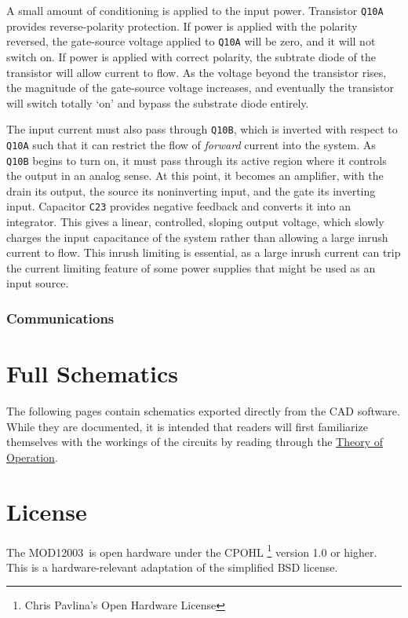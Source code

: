 \documentclass[letterpaper,twocolumn,10pt,openany,oneside,final,fleqn]{memoir}
\newcommand{\Model}{MOD12003\ }
\newcommand{\rd}[1]{\texttt{#1}}
\begin{document}
A small amount of conditioning is applied to the input power. Transistor \rd{Q10A}
provides reverse-polarity protection. If power is applied with the polarity reversed,
the gate-source voltage applied to \rd{Q10A} will be zero, and it will not switch
on. If power is applied with correct polarity, the subtrate diode of the transistor
will allow current to flow. As the voltage beyond the transistor rises, the magnitude
of the gate-source voltage increases, and eventually the transistor will switch totally
`on' and bypass the substrate diode entirely.

The input current must also pass through \rd{Q10B}, which is inverted with respect
to \rd{Q10A} such that it can restrict the flow of \emph{forward} current into the
system. As \rd{Q10B} begins to turn on, it must pass through its active region where
it controls the output in an analog sense. At this point, it becomes an amplifier,
with the drain its output, the source its noninverting input, and the gate its
inverting input. Capacitor \rd{C23} provides negative feedback and converts it into
an integrator. This gives a linear, controlled, sloping output voltage, which
slowly charges the input capacitance of the system rather than allowing a large
inrush current to flow. This inrush limiting is essential, as a large inrush current
can trip the current limiting feature of some power supplies that might be used
as an input source.

\subsection{Communications}


\newpage
\chapter{Full Schematics}
The following pages contain schematics exported directly from the CAD software.
While they are documented, it is intended that readers will first familiarize
themselves with the workings of the circuits by reading through the
\hyperref[chap:too]{Theory of Operation}.



\newpage
\chapter{License}

The \Model is open hardware under the CPOHL
\footnote{Chris Pavlina's Open Hardware License} version 1.0 or higher.
This is a hardware-relevant adaptation of the simplified BSD license.
\end{document}
